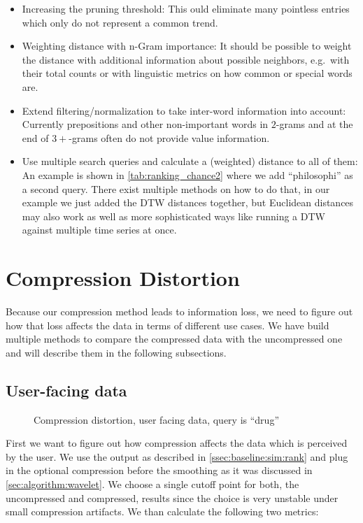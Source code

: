 \begin{itemize}
    \item Increasing the pruning threshold: This ould eliminate many pointless entries which only do not represent a common trend.
    \item Weighting distance with n-Gram importance: It should be possible to weight the distance with additional information about possible neighbors, e.g.\ with their total counts or with linguistic metrics on how common or special words are.
    \item Extend filtering/normalization to take inter-word information into account: Currently prepositions and other non-important words in $2$-grams and at the end of $3+$-grams often do not provide value information.
    \item Use multiple search queries and calculate a (weighted) distance to all of them: An example is shown in \autoref{tab:ranking_chance2} where we add \enquote{philosophi} as a second query. There exist multiple methods on how to do that, in our example we just added the DTW distances together, but Euclidean distances may also work as well as more sophisticated ways like running a DTW against multiple time series at once.
\end{itemize}



\section{Compression Distortion}
\label{sec:evaluation:distortion}

Because our compression method leads to information loss, we need to figure out how that loss affects the data in terms of different use cases. We have build multiple methods to compare the compressed data with the uncompressed one and will describe them in the following subsections.


\subsection{User-facing data}
\label{ssec:evaluation:distortion:user}

\begin{figure}
    \centering
    
    \caption{Compression distortion, user facing data, query is \enquote{drug}}\label{fig:compression}
\end{figure}

First we want to figure out how compression affects the data which is perceived by the user. We use the output as described in \autoref{ssec:baseline:sim:rank} and plug in the optional compression before the smoothing as it was discussed in \autoref{sec:algorithm:wavelet}. We choose a single cutoff point for both, the uncompressed and compressed, results since the choice is very unstable under small compression artifacts. We than calculate the following two metrics:

